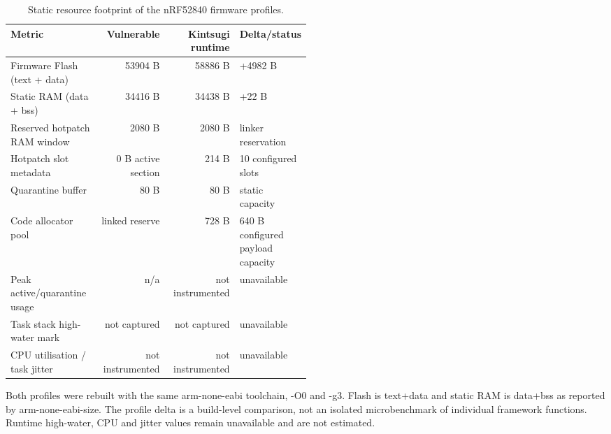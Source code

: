 \begin{table}[t]
\centering
\small
\caption{Static resource footprint of the nRF52840 firmware profiles.}
\label{tab:resource-footprint}
\begin{tabular}{p{0.30\linewidth}rrp{0.20\linewidth}}
\toprule
Metric & Vulnerable & Kintsugi runtime & Delta/status \\
\midrule
Firmware Flash (text + data) & 53904 B & 58886 B & +4982 B \\
Static RAM (data + bss) & 34416 B & 34438 B & +22 B \\
Reserved hotpatch RAM window & 2080 B & 2080 B & linker reservation \\
Hotpatch slot metadata & 0 B active section & 214 B & 10 configured slots \\
Quarantine buffer & 80 B & 80 B & static capacity \\
Code allocator pool & linked reserve & 728 B & 640 B configured payload capacity \\
Peak active/quarantine usage & n/a & not instrumented & unavailable \\
Task stack high-water mark & not captured & not captured & unavailable \\
CPU utilisation / task jitter & not instrumented & not instrumented & unavailable \\
\bottomrule
\end{tabular}
\begin{minipage}{0.98\linewidth}\footnotesize
Both profiles were rebuilt with the same arm-none-eabi toolchain, -O0 and -g3. Flash is text+data and static RAM is data+bss as reported by arm-none-eabi-size. The profile delta is a build-level comparison, not an isolated microbenchmark of individual framework functions. Runtime high-water, CPU and jitter values remain unavailable and are not estimated.
\end{minipage}
\end{table}
